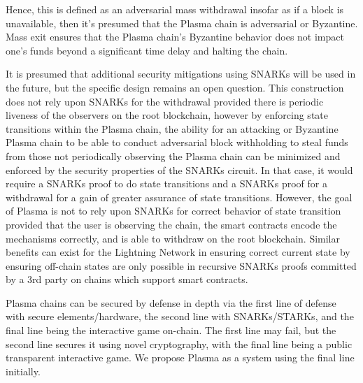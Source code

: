 \documentclass[letterpaper, 11pt]{article}
\begin{document}
Hence, this is defined as an adversarial mass withdrawal insofar as if a block
is unavailable, then it's presumed that the Plasma chain is adversarial or
Byzantine. Mass exit ensures that the Plasma chain's Byzantine behavior does not
impact one's funds beyond a significant time delay and halting the chain.

It is presumed that additional security mitigations using SNARKs will be used in
the future, but the specific design remains an open question. This construction
does not rely upon SNARKs for the withdrawal provided there is periodic liveness
of the observers on the root blockchain, however by enforcing state transitions
within the Plasma chain, the ability for an attacking or Byzantine Plasma chain
to be able to conduct adversarial block withholding to steal funds from those
not periodically observing the Plasma chain can be minimized and enforced by the
security properties of the SNARKs circuit. In that case, it would require a
SNARKs proof to do state transitions and a SNARKs proof for a withdrawal for a
gain of greater assurance of state transitions. However, the goal of Plasma is
not to rely upon SNARKs for correct behavior of state transition provided that
the user is observing the chain, the smart contracts encode the mechanisms
correctly, and is able to withdraw on the root blockchain. Similar benefits can
exist for the Lightning Network in ensuring correct current state by ensuring
off-chain states are only possible in recursive SNARKs proofs committed by a 3rd
party on chains which support smart contracts.

Plasma chains can be secured by defense in depth via the first line of defense
with secure elements/hardware, the second line with SNARKs/STARKs, and the final
line being the interactive game on-chain. The first line may fail, but the
second line secures it using novel cryptography, with the final line being a
public transparent interactive game. We propose Plasma as a system using the
final line initially.
\end{document}
